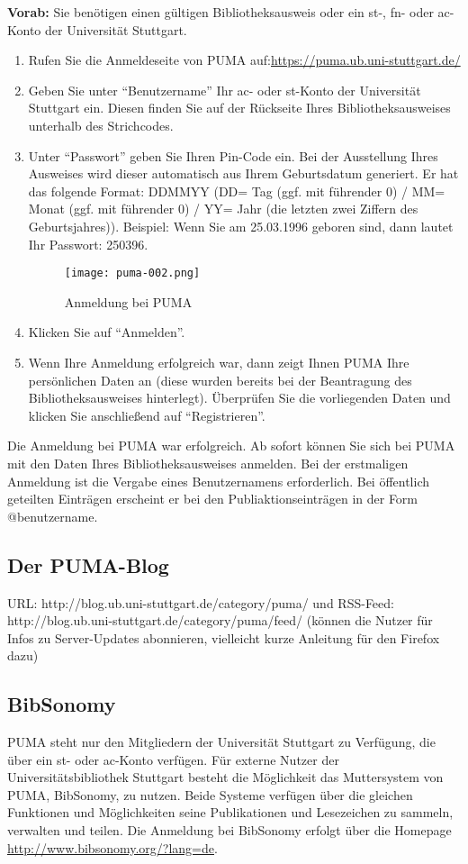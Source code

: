 \textbf{Vorab:} Sie benötigen einen gültigen Bibliotheksausweis oder ein st-, fn- oder ac-Konto der Universität Stuttgart.
\begin{enumerate}
    \item Rufen Sie die Anmeldeseite von PUMA auf:\newline \url{https://puma.ub.uni-stuttgart.de/}
    \item Geben Sie unter \enquote{Benutzername} Ihr ac- oder st-Konto der Universität Stuttgart ein. Diesen finden Sie auf der Rückseite Ihres Bibliotheksausweises unterhalb des Strichcodes. %
    \item Unter  \enquote{Passwort} geben Sie Ihren Pin-Code ein. Bei der Ausstellung Ihres Ausweises wird dieser automatisch aus Ihrem Geburtsdatum generiert. Er hat das folgende Format: DDMMYY (DD= Tag (ggf. mit führender 0) / MM= Monat (ggf. mit führender 0) / YY= Jahr (die letzten zwei Ziffern des Geburtsjahres)). Beispiel: Wenn Sie am 25.03.1996 geboren sind, dann lautet Ihr Passwort: 250396.
 \begin{figure}[ht]
 \centering
 \texttt{[image: puma-002.png]}
 \caption{Anmeldung bei PUMA}
 \label{figure2}
\end{figure}  
    \item Klicken Sie auf \enquote{Anmelden}.
    \item Wenn Ihre Anmeldung erfolgreich war, dann zeigt Ihnen PUMA Ihre persönlichen Daten an (diese wurden bereits bei der Beantragung des Bibliotheksausweises hinterlegt). Überprüfen Sie die vorliegenden Daten und klicken Sie anschließend auf \enquote{Registrieren}.
\end{enumerate}
Die Anmeldung bei PUMA war erfolgreich. Ab sofort können Sie sich bei PUMA mit den Daten Ihres Bibliotheksausweises anmelden. \newline
Bei der erstmaligen Anmeldung ist die Vergabe eines Benutzernamens erforderlich. Bei öffentlich geteilten Einträgen erscheint er bei den Publiaktionseinträgen in der Form @benutzername.
\subsection{Der PUMA-Blog}


URL: http://blog.ub.uni-stuttgart.de/category/puma/
und RSS-Feed: http://blog.ub.uni-stuttgart.de/category/puma/feed/
(können die Nutzer für Infos zu Server-Updates abonnieren, vielleicht
kurze Anleitung für den Firefox dazu)
\subsection{BibSonomy}
PUMA steht nur den Mitgliedern der Universität Stuttgart zu Verfügung, die über ein st- oder ac-Konto  verfügen. Für externe Nutzer der Universitätsbibliothek Stuttgart besteht die Möglichkeit das Muttersystem von PUMA, BibSonomy, zu nutzen. Beide Systeme verfügen über die gleichen Funktionen und Möglichkeiten seine Publikationen und Lesezeichen zu sammeln, verwalten und teilen. \newline
Die Anmeldung bei BibSonomy erfolgt über die Homepage \url{http://www.bibsonomy.org/?lang=de}. 


